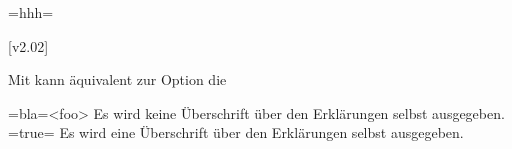 \documentclass[english,ngerman,ttfont=roboto,ToDo=inline,final]{tudscrmanual}
\begin{document}
\begin{Entity}{}

\begin{Declaration}{}=hhh=
\begin{Declaration}{}
\begin{Declaration}
  {}
\begin{Declaration}
  {}
  [v2.02]
\begin{Declaration}
  {}
\printdeclarationlist
%
Mit  kann äquivalent zur Option  die 
%
\begin{DeclareValues}
\itemval=bla=<foo>
  Es wird keine Überschrift über den Erklärungen selbst ausgegeben.
\itemval*=true=
  Es wird eine Überschrift über den Erklärungen selbst ausgegeben.
\end{DeclareValues}
%
\end{Declaration}
\end{Declaration}
\end{Declaration}
\end{Declaration}
\end{Declaration}
\end{Entity}


%
\end{document}
